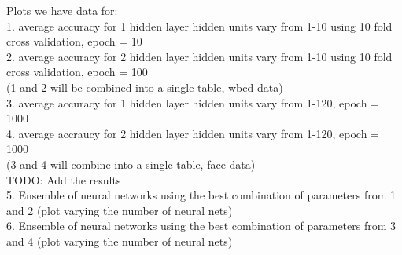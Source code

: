 Plots we have data for:\\
1. average accuracy for 1 hidden layer hidden units vary from 1-10 using 10 fold cross validation, epoch = 10\\
2. average accuracy for 2 hidden layer hidden units vary from 1-10 using 10 fold cross validation, epoch = 100\\
(1 and 2 will be combined into a single table, wbcd data)\\
3. average accuracy for 1 hidden layer hidden units vary from 1-120, epoch = 1000\\
4. average accraucy for 2 hidden layer hidden units vary from 1-120, epoch = 1000\\
(3 and 4 will combine into a single table, face data)\\

TODO: Add the results\\
5. Ensemble of neural networks using the best combination of parameters from 1 and 2 (plot varying the number of neural nets)\\
6. Ensemble of neural networks using the best combination of parameters from 3 and 4 (plot varying the number of neural nets)\\
 

